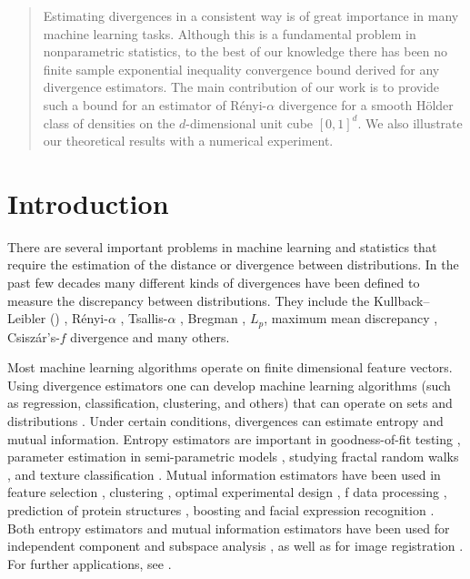 \begin{abstract}
Estimating divergences in a consistent way is of great importance in many
machine learning tasks. Although this is a fundamental problem in nonparametric
statistics, to the best of our knowledge there has been no finite sample
exponential inequality convergence bound derived for any divergence estimators.
The main contribution of our work is to provide such a bound for an estimator
of R\'enyi-$\alpha$ divergence for a smooth H\"older class of densities on the
$d$-dimensional unit cube $[0,1]^d$.
We also illustrate our theoretical results with a numerical experiment.
\end{abstract}

\section{Introduction}
There are several important problems in machine learning and statistics that
require the estimation of the distance or divergence between distributions. In
the past few decades many different kinds of divergences have been defined to
measure the discrepancy between distributions. They include the
Kullback--Leibler () \citep{kullback51KL},
R\'enyi-$\alpha$ \citep{renyi61measures,renyi70probability},
Tsallis-$\alpha$ \citep{villmann10mathematical},
Bregman \citep{bregman67divergence},
$L_p$,
maximum mean discrepancy \citep{Borgwardt06MMD},
Csisz\'ar's-$f$ divergence \citep{csiszar67information}
and many others.

Most machine learning algorithms operate on finite dimensional feature vectors.
Using divergence estimators one can develop machine learning algorithms (such
as regression, classification, clustering, and  others) that can operate on
sets and distributions \citep{poczos12kernelimages,oliva13ICML}. Under certain
conditions, divergences can estimate entropy and mutual information. Entropy
estimators are important in
goodness-of-fit testing \citep{goria05new},
parameter estimation in semi-parametric models \citep{Wolsztynski85minimum},
studying fractal random walks \citep{Alemany94fractal},
and texture classification \citep{hero02alpha,hero2002aes}.
Mutual information estimators have been used
in feature selection \citep{peng05feature},
clustering \citep{aghagolzadeh07hierarchical},
optimal experimental design \citep{lewi07realtime}, %
f data processing \citep{chai09exploring},
prediction of protein structures \citep{adami04information},
boosting and facial expression recognition \citep{Shan05conditionalmutual}.
Both entropy estimators and mutual information estimators have been used for
independent component and subspace analysis
\citep{radical03,szabo07undercomplete_TCC}, %
as well as for image registration
\citep{kybic06incremental,hero02alpha,hero2002aes}.
For further applications, see
\citet{Leonenko-Pronzato-Savani2008}.

